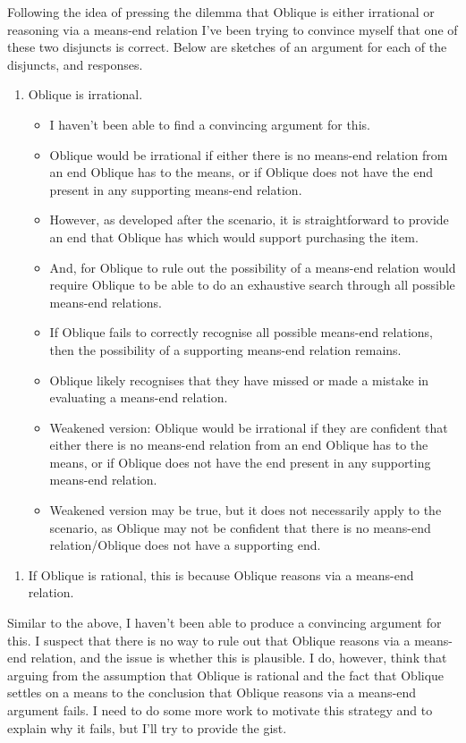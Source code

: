 \documentclass[10pt]{article}
\begin{document}
Following the idea of pressing the dilemma that Oblique is either irrational or reasoning via a means-end relation I've been trying to convince myself that one of these two disjuncts is correct.
Below are sketches of an argument for each of the disjuncts, and responses.

\begin{enumerate}[resume]
\item Oblique is irrational.
  \begin{itemize}
  \item I haven't been able to find a convincing argument for this.
  \item Oblique would be irrational if either there is no means-end relation from an end Oblique has to the means, or if Oblique does not have the end present in any supporting means-end relation.
  \item However, as developed after the scenario, it is straightforward to provide an end that Oblique has which would support purchasing the item.
  \item And, for Oblique to rule out the possibility of a means-end relation would require Oblique to be able to do an exhaustive search through all possible means-end relations.
  \item If Oblique fails to correctly recognise all possible means-end relations, then the possibility of a supporting means-end relation remains.
  \item Oblique likely recognises that they have missed or made a mistake in evaluating a means-end relation.
  \item Weakened version: Oblique would be irrational if they are confident that either there is no means-end relation from an end Oblique has to the means, or if Oblique does not have the end present in any supporting means-end relation.
  \item Weakened version may be true, but it does not necessarily apply to the scenario, as Oblique may not be confident that there is no means-end relation/Oblique does not have a supporting end.
  \end{itemize}
\end{enumerate}

\begin{enumerate}[resume]
\item If Oblique is rational, this is because Oblique reasons via a means-end relation.
\end{enumerate}

Similar to the above, I haven't been able to produce a convincing argument for this.
I suspect that there is no way to rule out that Oblique reasons via a means-end relation, and the issue is whether this is plausible.
I do, however, think that arguing from the assumption that Oblique is rational and the fact that Oblique settles on a means to the conclusion that Oblique reasons via a means-end argument fails.
I need to do some more work to motivate this strategy and to explain why it fails, but I'll try to provide the gist.
\end{document}
